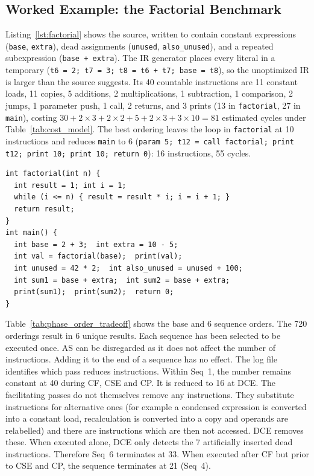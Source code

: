 \documentclass[conference,a4paper]{IEEEtran}
\begin{document}
\subsection{Worked Example: the Factorial Benchmark}
\label{sec:factorial}
Listing~\ref{lst:factorial} shows the source, written to contain constant expressions (\texttt{base}, \texttt{extra}), dead assignments (\texttt{unused}, \texttt{also\_unused}), and a repeated subexpression (\texttt{base + extra}). The IR generator places every literal in a temporary (\texttt{t6 = 2; t7 = 3; t8 = t6 + t7; base = t8}), so the unoptimized IR is larger than the source suggests. Its 40 countable instructions are 11 constant loads, 11 copies, 5 additions, 2 multiplications, 1 subtraction, 1 comparison, 2 jumps, 1 parameter push, 1 call, 2 returns, and 3 prints (13 in \texttt{factorial}, 27 in \texttt{main}), costing $30 + 2 \times 3 + 2 \times 2 + 5 + 2 \times 3 + 3 \times 10 = 81$ estimated cycles under Table~\ref{tab:cost_model}. The best ordering leaves the loop in \texttt{factorial} at 10 instructions and reduces \texttt{main} to 6 (\texttt{param 5; t12 = call factorial; print t12; print 10; print 10; return 0}): 16 instructions, 55 cycles.

\begin{lstlisting}[caption={The \texttt{factorial} benchmark (comments removed).},label={lst:factorial}]
int factorial(int n) {
  int result = 1; int i = 1;
  while (i <= n) { result = result * i; i = i + 1; }
  return result;
}
int main() {
  int base = 2 + 3;  int extra = 10 - 5;
  int val = factorial(base);  print(val);
  int unused = 42 * 2;  int also_unused = unused + 100;
  int sum1 = base + extra;  int sum2 = base + extra;
  print(sum1);  print(sum2);  return 0;
}
\end{lstlisting}

Table~\ref{tab:phase_order_tradeoff} shows the base and 6 sequence orders. The 720 orderings result in 6 unique results. Each sequence has been selected to be executed once. AS can be disregarded as it does not affect the number of instructions. Adding it to the end of a sequence has no effect. The log file identifies which pass reduces instructions. Within Seq~1, the number remains constant at 40 during CF, CSE and CP. It is reduced to 16 at DCE. The facilitating passes do not themselves remove any instructions. They substitute instructions for alternative ones (for example a condensed expression is converted into a constant load, recalculation is converted into a copy and operands are relabelled) and there are instructions which are then not accessed. DCE removes these. When executed alone, DCE only detects the 7 artificially inserted dead instructions. Therefore Seq~6 terminates at 33. When executed after CF but prior to CSE and CP, the sequence terminates at 21 (Seq~4).
\end{document}
